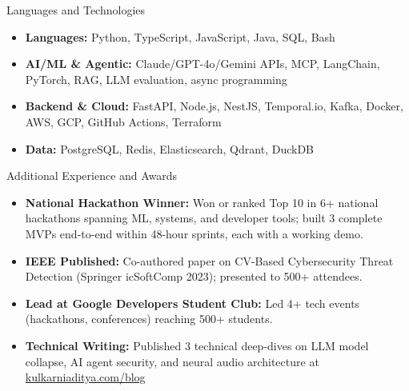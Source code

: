 \documentclass[]{mcdowellcv}
\begin{document}
\begin{cvsection}{Languages and Technologies}
  \begin{cvsubsection}{}{}{}
    \begin{itemize}
      \item \textbf{Languages:} Python, TypeScript, JavaScript, Java, SQL, Bash
      \item \textbf{AI/ML \& Agentic:} Claude/GPT-4o/Gemini APIs, MCP, LangChain, PyTorch, RAG, LLM evaluation, async programming
      \item \textbf{Backend \& Cloud:} FastAPI, Node.js, NestJS, Temporal.io, Kafka, Docker, AWS, GCP, GitHub Actions, Terraform
      \item \textbf{Data:} PostgreSQL, Redis, Elasticsearch, Qdrant, DuckDB
    \end{itemize}
  \end{cvsubsection}
\end{cvsection}

\begin{cvsection}{Additional Experience and Awards}
  \begin{cvsubsection}{}{}{}
    \begin{itemize}
      \item \textbf{National Hackathon Winner:} Won or ranked Top 10 in 6+ national hackathons spanning ML, systems, and developer tools; built 3 complete MVPs end-to-end within 48-hour sprints, each with a working demo.
      \item \textbf{IEEE Published:} Co-authored paper on CV-Based Cybersecurity Threat Detection (Springer icSoftComp 2023); presented to 500+ attendees.
      \item \textbf{Lead at Google Developers Student Club:} Led 4+ tech events (hackathons, conferences) reaching 500+ students.
      \item \textbf{Technical Writing:} Published 3 technical deep-dives on LLM model collapse, AI agent security, and neural audio architecture at \href{https://www.kulkarniaditya.com/blog}{kulkarniaditya.com/blog}
    \end{itemize}
  \end{cvsubsection}
\end{cvsection}
\end{document}
